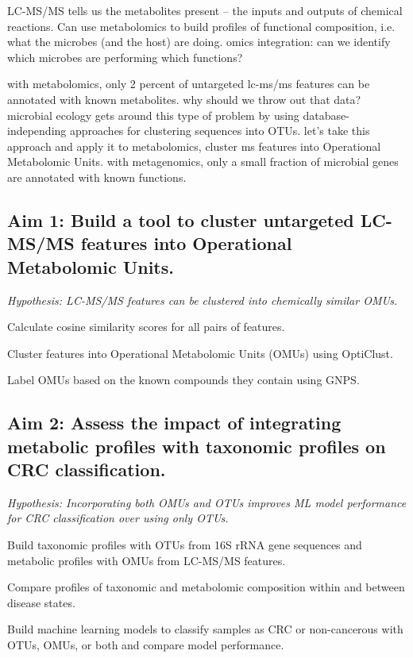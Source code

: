 \documentclass[11pt]{article}
\begin{document}
LC-MS/MS tells us the metabolites present -- the inputs and outputs of chemical reactions.
Can use metabolomics to build profiles of functional composition, i.e. what the microbes (and the host) are doing.
omics integration: can we identify which microbes are performing which functions?

with metabolomics, only 2 percent of untargeted lc-ms/ms features can be annotated with known metabolites.
why should we throw out that data?
microbial ecology gets around this type of problem by using database-independing approaches for clustering sequences into OTUs.
let's take this approach and apply it to metabolomics, cluster ms features into Operational Metabolomic Units.
with metagenomics, only a small fraction of microbial genes are annotated with known functions.

\subsection*{Aim 1: Build a tool to cluster untargeted LC-MS/MS features into Operational Metabolomic Units.}
\textit{Hypothesis: LC-MS/MS features can be clustered into chemically similar OMUs.}

\begin{compactenum}[A.]
    \item Calculate cosine similarity scores for all pairs of features.
    \item Cluster features into Operational Metabolomic Units (OMUs) using OptiClust.
    \item Label OMUs based on the known compounds they contain using GNPS.
\end{compactenum}

\subsection*{Aim 2: Assess the impact of integrating metabolic profiles with taxonomic profiles on CRC classification.}
\textit{Hypothesis: Incorporating both OMUs and OTUs improves ML model performance for CRC classification over using only OTUs.}

\begin{compactenum}[A.]
    \item Build taxonomic profiles with OTUs from 16S rRNA gene sequences and
    metabolic profiles with OMUs from LC-MS/MS features.
    \item Compare profiles of taxonomic and metabolomic composition within and between disease states.
    \item Build machine learning models to classify samples as CRC or non-cancerous with OTUs, OMUs, or both and compare model performance.
\end{compactenum}
\end{document}
